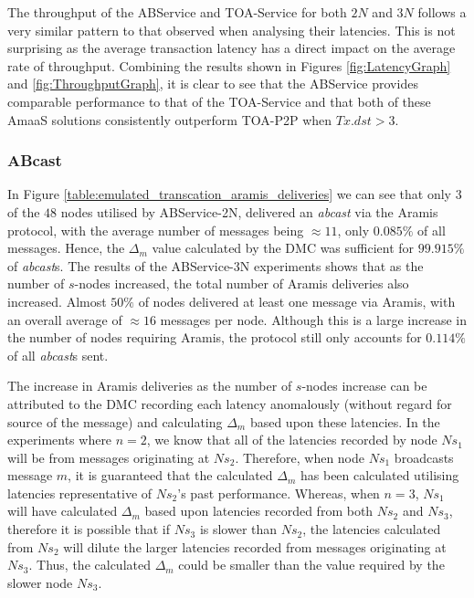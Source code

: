 	The throughput of the ABService and TOA-Service for both $2N$ and $3N$ follows a very similar pattern to that observed when analysing their latencies.  This is not surprising as the average transaction latency has a direct impact on the average rate of throughput.  Combining the results shown in Figures \ref{fig:LatencyGraph} and \ref{fig:ThroughputGraph}, it is clear to see that the ABService provides comparable performance to that of the TOA-Service and that both of these \textsf{AmaaS} solutions consistently outperform TOA-P2P when $Tx.dst > 3$.  
	
	\subsubsection*{ABcast}
	In Figure \ref{table:emulated_transcation_aramis_deliveries} we can see that only $3$ of the $48$ nodes utilised by ABService-2N, delivered an \emph{abcast} via the \textsf{Aramis} protocol, with the average number of messages being $\approx 11$, only $0.085\%$ of all messages.  Hence, the $\Delta_m$ value calculated by the DMC was sufficient for  $99.915\%$ of \emph{abcast}s.  The results of the ABService-3N experiments shows that as the number of $s$-nodes increased,  the total number of \textsf{Aramis} deliveries also increased.  Almost $50\%$ of nodes delivered at least one message via \textsf{Aramis}, with an overall average of $\approx 16$ messages per node.  Although this is a large increase in the number of nodes requiring \textsf{Aramis}, the protocol still only accounts for $0.114\%$ of all \emph{abcast}s sent.  
	
	The increase in \textsf{Aramis} deliveries as the number of $s$-nodes increase can be attributed to the DMC recording each latency anomalously (without regard for source of the message) and calculating $\Delta_m$ based upon these latencies.  In the experiments where $n=2$, we know that all of the latencies recorded by node $Ns_1$ will be from messages originating at $Ns_2$.  Therefore, when node $Ns_1$ broadcasts message $m$, it is guaranteed that the calculated $\Delta_m$ has been calculated utilising latencies representative of $Ns_2$'s past performance.  Whereas, when $n=3$, $Ns_1$ will have calculated $\Delta_m$ based upon latencies recorded from both $Ns_2$ and $Ns_3$, therefore it is possible that if $Ns_3$ is slower than $Ns_2$, the latencies calculated from $Ns_2$ will dilute the larger latencies recorded from messages originating at $Ns_3$.  Thus, the calculated $\Delta_m$ could be smaller than the value required by the slower node $Ns_3$.  
	
